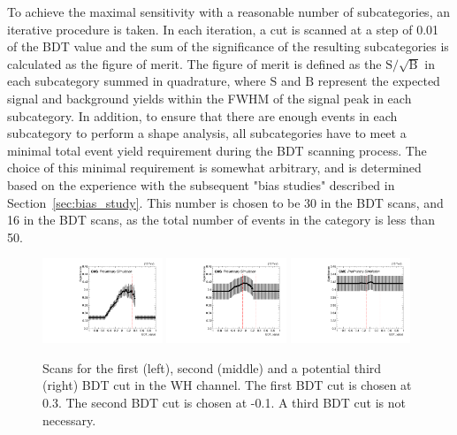 To achieve the maximal sensitivity with a reasonable number of subcategories, 
an iterative procedure is taken.  
In each iteration, a cut is scanned at a step of 0.01 of the BDT value and the sum of
the significance of the resulting subcategories is calculated as the figure of merit. 
The figure of merit is defined as the $\mathrm{S}/\sqrt{\mathrm{B}}$ in each subcategory 
summed in quadrature, where $\mathrm{S}$ and $\mathrm{B}$ represent the expected 
signal and background yields within the FWHM of the signal peak in each subcategory.
In addition, to ensure that there are enough events in each subcategory to perform a shape analysis,
all subcategories have to meet a minimal total event yield requirement during the BDT scanning process.
The choice of this minimal requirement is somewhat arbitrary,
and is determined based on the experience with the subsequent "bias studies" described in Section~\ref{sec:bias_study}.
This number is chosen to be 30 in the \WH BDT scans,
and 16 in the \ZH BDT scans, as the total number of events in the \ZH category is less than 50. 

\begin{figure}[!htb]
  \centering
  \captionsetup{justification=justified}
  \includegraphics[width=0.32\textwidth]{pics/VH_sec/VH_BDT_cats/WH_BDT_scan1.pdf}
  \includegraphics[width=0.32\textwidth]{pics/VH_sec/VH_BDT_cats/WH_BDT_scan2.pdf}
  \includegraphics[width=0.32\textwidth]{pics/VH_sec/VH_BDT_cats/WH_BDT_scan3.pdf}
  \caption{Scans for the first (left), second (middle) and a potential third (right) BDT cut in the WH channel.
           The first BDT cut is chosen at 0.3. The second BDT cut is chosen at -0.1. A third BDT cut is not necessary.}
  \label{fig:wh_bdt_cat_scan}
\end{figure}

